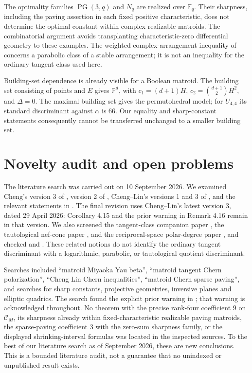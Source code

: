 \documentclass[12pt]{amsart}
\theoremstyle{definition}
\theoremstyle{remark}
\numberwithin{equation}{section}
\begin{document}
The optimality families $\operatorname{PG}(3,q)$ and $N_q$ are realized over $\mathbb F_q$. Their sharpness, including the paving assertion in each fixed positive characteristic, does not determine the optimal constant within complex-realizable matroids. The combinatorial argument avoids transplanting characteristic-zero differential geometry to these examples. The weighted complex-arrangement inequality of \cite[Theorem 1.1]{BP} concerns a parabolic class of a stable arrangement; it is not an inequality for the ordinary tangent class used here.

Building-set dependence is already visible for a Boolean matroid. The building set consisting of points and $E$ gives $\mathbb P^d$, with $c_1=(d+1)H$, $c_2=\binom{d+1}2H^2$, and $\Delta=0$. The maximal building set gives the permutohedral model; for $U_{4,4}$ its standard discriminant against $\alpha$ is $66$. Our equality and sharp-constant statements consequently cannot be transferred unchanged to a smaller building set.

\section{Novelty audit and open problems}
The literature search was carried out on 10 September 2026. We examined Cheng's version 3 of \cite{Che}, version 2 of \cite{CheG}, Cheng--Lin's versions 1 and 3 of \cite{CL}, and the relevant statements in \cite{FY,AHK,ADH,BH,Man}. The final revision uses Cheng--Lin's latest version 3, dated 29 April 2026: Corollary 4.15 and the prior warning in Remark 4.16 remain in that version. We also screened the tangent-class companion paper \cite{CLG}, the tautological nef-cone paper \cite{Sta}, and the reciprocal-space polar-degree paper \cite{BKW}, and checked \cite[Theorem 1.1]{BP} and \cite[Lemma 2.3]{Ali}. These related notions do not identify the ordinary tangent discriminant with a logarithmic, parabolic, or tautological quotient discriminant.

Searches included ``matroid Miyaoka Yau beta'', ``matroid tangent Chern polarization'', ``Cheng Lin Chern inequalities'', ``matroid Chern sparse paving'', and searches for sharp constants, projective geometries, inversive planes and elliptic quadrics. The search found the explicit prior warning in \cite[Remark 4.16]{CL}; that warning is acknowledged throughout. No theorem with the precise rank-four coefficient $9$ on $\mathscr C_M$, its sharpness already within fixed-characteristic realizable paving matroids, the sparse-paving coefficient $3$ with the zero-sum sharpness family, or the displayed shrinking-interval formulas was located in the inspected sources. To the best of our literature search as of September 2026, these are new conclusions. This is a bounded literature audit, not a guarantee that no unindexed or unpublished result exists.
\end{document}

